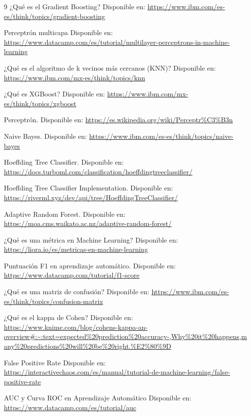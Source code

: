 \documentclass[12pt,a4paper]{report}
\begin{document}
\begin{thebibliography}{9}
¿Qué es el Gradient Boosting?
Disponible en: \url{https://www.ibm.com/es-es/think/topics/gradient-boosting}

Perceptrón multicapa
Disponible en: \url{https://www.datacamp.com/es/tutorial/multilayer-perceptrons-in-machine-learning}

¿Qué es el algoritmo de k vecinos más cercanos (KNN)?
Disponible en: \url{https://www.ibm.com/mx-es/think/topics/knn}

¿Qué es XGBoost?
Disponible en: \url{https://www.ibm.com/mx-es/think/topics/xgboost}

Perceptrón.
Disponible en: \url{https://es.wikipedia.org/wiki/Perceptr%C3%B3n}

Naive Bayes.
Disponible en: \url{https://www.ibm.com/es-es/think/topics/naive-bayes}

Hoeffding Tree Classifier.
Disponible en: \url{https://docs.turboml.com/classification/hoeffdingtreeclassifier/}

Hoeffding Tree Classifier Implementation.
Disponible en: \url{https://riverml.xyz/dev/api/tree/HoeffdingTreeClassifier/}

Adaptive Random Forest.
Disponible en: \url{https://moa.cms.waikato.ac.nz/adaptive-random-forest/}

¿Qué es una métrica en Machine Learning?
Disponible en: \url{https://liora.io/es/metricas-en-machine-learning}

Puntuación F1 en aprendizaje automático.
Disponible en: \url{https://www.datacamp.com/tutorial/f1-score}

¿Qué es una matriz de confusión?
Disponible en: \url{https://www.ibm.com/es-es/think/topics/confusion-matrix}

¿Qué es el kappa de Cohen?
Disponible en: \url{https://www.knime.com/blog/cohens-kappa-an-overview#:~:text=expected%20prediction%20accuracy-,Why%20it%20happens,many%20predictions%20will%20be%20right.%E2%80%9D}

False Positive Rate
Disponible en: \url{https://interactivechaos.com/es/manual/tutorial-de-machine-learning/false-positive-rate}

AUC y Curva ROC en Aprendizaje Automático
Disponible en: \url{https://www.datacamp.com/es/tutorial/auc}


\end{thebibliography}
\end{document}
